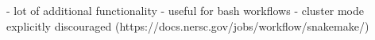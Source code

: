 - lot of additional functionality
- useful for bash workflows
- cluster mode explicitly discouraged (https://docs.nersc.gov/jobs/workflow/snakemake/)

